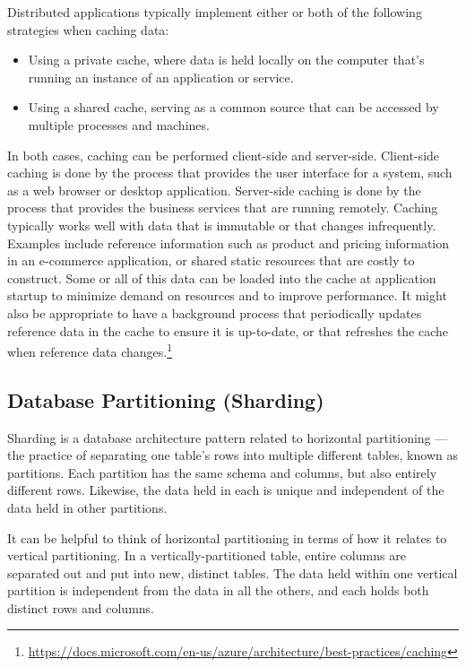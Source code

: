 \documentclass[a4paper, 11.25pt]{article}
\begin{document}
Distributed applications typically implement either or both of the following strategies when caching data:
\begin{itemize}
    \item Using a private cache, where data is held locally on the computer that's running an instance of an application or service.
    \item Using a shared cache, serving as a common source that can be accessed by multiple processes and machines.
\end{itemize}

In both cases, caching can be performed client-side and server-side. Client-side caching is done by the process that provides the user interface for a system, such as a web browser or desktop application. Server-side caching is done by the process that provides the business services that are running remotely. 
Caching typically works well with data that is immutable or that changes infrequently. Examples include reference information such as product and pricing information in an e-commerce application, or shared static resources that are costly to construct. Some or all of this data can be loaded into the cache at application startup to minimize demand on resources and to improve performance. It might also be appropriate to have a background process that periodically updates reference data in the cache to ensure it is up-to-date, or that refreshes the cache when reference data changes.\footnote{\url{https://docs.microsoft.com/en-us/azure/architecture/best-practices/caching}}

\subsection{Database Partitioning (Sharding)}
Sharding is a database architecture pattern related to horizontal partitioning — the practice of separating one table’s rows into multiple different tables, known as partitions. Each partition has the same schema and columns, but also entirely different rows. Likewise, the data held in each is unique and independent of the data held in other partitions.

It can be helpful to think of horizontal partitioning in terms of how it relates to vertical partitioning. In a vertically-partitioned table, entire columns are separated out and put into new, distinct tables. The data held within one vertical partition is independent from the data in all the others, and each holds both distinct rows and columns.
\end{document}
